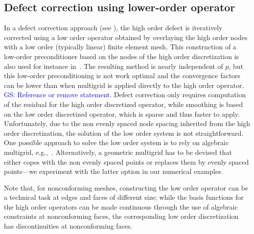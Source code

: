 \documentclass[smallcondensed,final]{svjour3}     %
\newcommand{\gsnote}[1]{\textcolor{blue}{GS: #1}}
\begin{document}
\subsection{Defect correction using lower-order operator}\label{subsec:low}
In a defect correction approach (see
\cite{TrottenbergOosterleeSchuller01}), the high order defect is
iteratively corrected using a low order operator obtained by
overlaying the high order nodes with a low order (typically linear)
finite element mesh.  This construction of a low-order preconditioner
based on the nodes of the high order discretization is also used for
instance
in~\cite{Brown10,Kim07,DevilleMund90,HeysManteuffelMcCormickEtAl05}.
The resulting method is nearly independent of $p$, but this low-order
preconditioning is not work optimal and the convergence factors can be
lower than when multigrid is applied directly to the high order
operator. \gsnote{Reference or remove statement.} Defect correction
only requires computation of the residual for the high order
discretized operator, while smoothing is based on the low order
discretized operator, which is sparse and thus faster to apply.
%
Unfortunately, due to the non evenly spaced node spacing inherited
from the high order discretization, the solution of the low order
system is not straightforward. One possible approach to solve the low
order system is to rely on algebraic multigrid,
e.g.,~\cite{Brown10,HeysManteuffelMcCormickEtAl05}. Alternatively, a
geometric multigrid has to be devised that either copes with the non
evenly spaced points or replaces them by evenly spaced points---we
experiment with the latter option in our numerical examples.

Note that, for nonconforming meshes, constructing the low order
operator can be a technical task at edges and faces of different size;
while the basis functions for the high order operators can be made
continuous through the use of algebraic constraints at nonconforming
faces, the corresponding low order discretization has discontinuities
at nonconforming faces.




\end{document}
